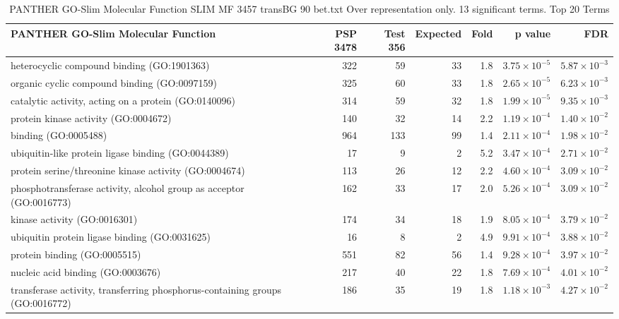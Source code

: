 \begin{table}[ht]
\centering
\begin{adjustbox}{width=\textwidth}
\begin{tabular}{lrrrrrr}
  \hline
PANTHER GO-Slim Molecular Function & PSP 3478 & Test 356 & Expected & Fold & p value & FDR \\ 
  \hline
heterocyclic compound binding (GO:1901363) & 322 & 59 & 33 & 1.8 & $3.75 \times 10^{-5}$ & $5.87 \times 10^{-3}$ \\ 
  organic cyclic compound binding (GO:0097159) & 325 & 60 & 33 & 1.8 & $2.65 \times 10^{-5}$ & $6.23 \times 10^{-3}$ \\ 
  catalytic activity, acting on a protein (GO:0140096) & 314 & 59 & 32 & 1.8 & $1.99 \times 10^{-5}$ & $9.35 \times 10^{-3}$ \\ 
  protein kinase activity (GO:0004672) & 140 & 32 & 14 & 2.2 & $1.19 \times 10^{-4}$ & $1.40 \times 10^{-2}$ \\ 
  binding (GO:0005488) & 964 & 133 & 99 & 1.4 & $2.11 \times 10^{-4}$ & $1.98 \times 10^{-2}$ \\ 
  ubiquitin-like protein ligase binding (GO:0044389) & 17 & 9 & 2 & 5.2 & $3.47 \times 10^{-4}$ & $2.71 \times 10^{-2}$ \\ 
  protein serine/threonine kinase activity (GO:0004674) & 113 & 26 & 12 & 2.2 & $4.60 \times 10^{-4}$ & $3.09 \times 10^{-2}$ \\ 
  phosphotransferase activity, alcohol group as acceptor (GO:0016773) & 162 & 33 & 17 & 2.0 & $5.26 \times 10^{-4}$ & $3.09 \times 10^{-2}$ \\ 
  kinase activity (GO:0016301) & 174 & 34 & 18 & 1.9 & $8.05 \times 10^{-4}$ & $3.79 \times 10^{-2}$ \\ 
  ubiquitin protein ligase binding (GO:0031625) & 16 & 8 & 2 & 4.9 & $9.91 \times 10^{-4}$ & $3.88 \times 10^{-2}$ \\ 
  protein binding (GO:0005515) & 551 & 82 & 56 & 1.4 & $9.28 \times 10^{-4}$ & $3.97 \times 10^{-2}$ \\ 
  nucleic acid binding (GO:0003676) & 217 & 40 & 22 & 1.8 & $7.69 \times 10^{-4}$ & $4.01 \times 10^{-2}$ \\ 
  transferase activity, transferring phosphorus-containing groups (GO:0016772) & 186 & 35 & 19 & 1.8 & $1.18 \times 10^{-3}$ & $4.27 \times 10^{-2}$ \\ 
   \hline
\end{tabular}
\end{adjustbox}
\caption{PANTHER GO-Slim Molecular Function SLIM MF 3457 transBG 90 bet.txt Over representation only. 13 significant terms. Top 20 Terms} 
\label{tab:PANTHER GO-Slim Molecular Function SLIM MF 3457 transBG 90 bet.txt Over representation only. 13 significant terms. Top 20 Terms}
\end{table}

